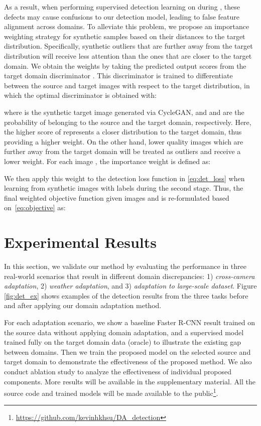 \documentclass[10pt,twocolumn,letterpaper]{article}
\begin{document}
As a result, when performing supervised detection learning on  during , these defects may cause confusions to our detection model, leading to false feature alignment across domains.
To alleviate this problem, we propose an importance weighting strategy for synthetic samples based on their distances to the target distribution.
Specifically, synthetic outliers that are further away from the target distribution will receive less attention than the ones that are closer to the target domain.
We obtain the weights by taking the predicted output scores from the target domain discriminator .
This discriminator is trained to differentiate between the source and target images with respect to the target distribution, in which the optimal discriminator is obtained with:

where  is the synthetic target image generated via CycleGAN, and  and  are the probability of  belonging to the source and the target domain, respectively.
Here, the higher score of  represents a closer distribution to the target domain, thus providing a higher weight.
On the other hand, lower quality images which are further away from the target domain will be treated as outliers and receive a lower weight.
For each image , the importance weight is defined as:

We then apply this weight to the detection loss function in \eqref{eq:det_loss} when learning from synthetic images with labels during the second stage.
Thus, the final weighted objective function given images  and  is re-formulated based on~\eqref{eq:objective} as:



\section{Experimental Results} \label{experiments}
In this section, we validate our method by evaluating the performance in three real-world scenarios that result in different domain discrepancies:
1) \textit{cross-camera adaptation},
2) \textit{weather adaptation},
and 3) \textit{adaptation to large-scale dataset}.
Figure \ref{fig:det_ex} shows examples of the detection results from the three tasks before and after applying our domain adaptation method.

For each adaptation scenario, we show a baseline Faster R-CNN result trained on the source data without applying domain adaptation, and a supervised model trained fully on the target domain data (oracle) to illustrate the existing gap between domains.
Then we train the proposed model on the selected source and target domain to demonstrate the effectiveness of the proposed method.
We also conduct ablation study to analyze the effectiveness of individual proposed components.
More results will be available in the supplementary material.
All the source code and trained models will be made available to the public\footnote{\url{https://github.com/kevinhkhsu/DA_detection}}.
\end{document}
